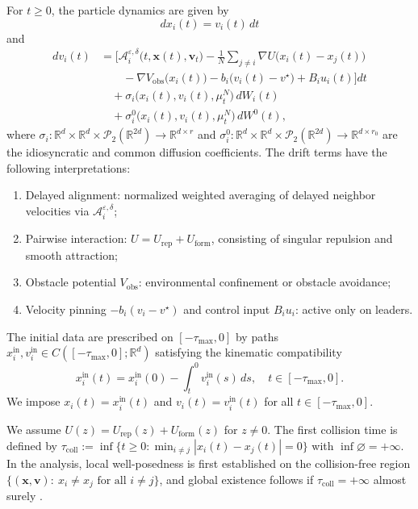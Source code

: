 \documentclass[pdflatex,sn-mathphys-num]{sn-jnl}%
\numberwithin{equation}{section}
\theoremstyle{thmstyleone}%
\theoremstyle{remark}
\theoremstyle{definition}
\newcommand{\R}{\mathbb{R}}
\newcommand{\calP}{\mathcal{P}}
\newcommand{\vstar}{v^{\star}}
\begin{document}
For $t\ge 0$, the particle dynamics are given by
\begin{equation}\label{eq:pos}
  dx_i(t)=v_i(t)\,dt
\end{equation}
and
\begin{equation}\label{eq:vel}
\begin{aligned}
  dv_i(t) &= \Biggl[ \mathcal A_i^{\varepsilon,\delta}\bigl(t,\mathbf{x}(t),\mathbf{v}_t\bigr)
    - \frac{1}{N}\sum_{j\neq i}\nabla U\bigl(x_i(t)-x_j(t)\bigr) \\
  &\qquad - \nabla V_{\mathrm{obs}}\bigl(x_i(t)\bigr)
    - b_i\bigl(v_i(t)-\vstar\bigr) + B_i u_i(t) \Biggr]dt \\
  &\quad +\sigma_i\bigl(x_i(t),v_i(t),\mu_t^N\bigr)\,dW_i(t) \\
  &\quad +\sigma_i^{0}\bigl(x_i(t),v_i(t),\mu_t^N\bigr)\,dW^0(t),
\end{aligned}
\end{equation}
where
$\sigma_i:\R^d\times\R^d\times\calP_2(\R^{2d})\to\R^{d\times r}$ and
$\sigma_i^0:\R^d\times\R^d\times\calP_2(\R^{2d})\to\R^{d\times r_0}$ are the
idiosyncratic and common diffusion coefficients. The drift terms have the
following interpretations:
\begin{enumerate}[label=(\roman*)]
\item Delayed alignment: normalized weighted averaging of delayed
neighbor velocities via $\mathcal A_i^{\varepsilon,\delta}$;
\item Pairwise interaction: $U=U_{\mathrm{rep}}+U_{\mathrm{form}}$,
consisting of singular repulsion and smooth attraction;
\item Obstacle potential $V_{\mathrm{obs}}$: environmental
confinement or obstacle avoidance;
\item Velocity pinning $-b_i(v_i-\vstar)$ and control input $B_i u_i$: active only on leaders.
\end{enumerate}

The initial data are prescribed on $[-\tau_{\max},0]$ by paths
$x_i^{\mathrm{in}},v_i^{\mathrm{in}} \in C([-\tau_{\max},0];\R^d)$ satisfying
the kinematic compatibility
\begin{equation}\label{eq:compat}
  x_i^{\mathrm{in}}(t) = x_i^{\mathrm{in}}(0) - \int_t^0 v_i^{\mathrm{in}}(s)\,ds,
  \quad t\in[-\tau_{\max},0].
\end{equation}
We impose $x_i(t)=x_i^{\mathrm{in}}(t)$ and $v_i(t)=v_i^{\mathrm{in}}(t)$
for all $t\in[-\tau_{\max},0]$.

We assume $U(z)=U_{\mathrm{rep}}(z)+U_{\mathrm{form}}(z)$ for $z\neq 0$. The
first collision time is defined by
$\tau_{\mathrm{coll}} := \inf\{ t\ge 0:\min_{i\neq j}|x_i(t)-x_j(t)|=0 \}$
with $\inf\varnothing=+\infty$. In the analysis, local well-posedness is
first established on the collision-free region
$\{(\mathbf{x},\mathbf{v}):\ x_i\neq x_j \text{ for all } i\neq j\}$, and global
existence follows if $\tau_{\mathrm{coll}}=+\infty$ almost surely
\cite{cucker2010avoiding,carrillo2017sharp,park2010cucker}.
\end{document}
